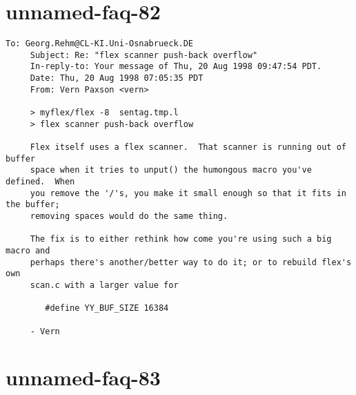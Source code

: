 \documentclass[openany,oneside]{book}
\begin{document}
\section{unnamed-faq-82}

\begin{verbatim}
To: Georg.Rehm@CL-KI.Uni-Osnabrueck.DE
     Subject: Re: "flex scanner push-back overflow"
     In-reply-to: Your message of Thu, 20 Aug 1998 09:47:54 PDT.
     Date: Thu, 20 Aug 1998 07:05:35 PDT
     From: Vern Paxson <vern>
     
     > myflex/flex -8  sentag.tmp.l
     > flex scanner push-back overflow
     
     Flex itself uses a flex scanner.  That scanner is running out of buffer
     space when it tries to unput() the humongous macro you've defined.  When
     you remove the '/'s, you make it small enough so that it fits in the buffer;
     removing spaces would do the same thing.
     
     The fix is to either rethink how come you're using such a big macro and
     perhaps there's another/better way to do it; or to rebuild flex's own
     scan.c with a larger value for
     
     	#define YY_BUF_SIZE 16384
     
     - Vern
\end{verbatim}

\section{unnamed-faq-83}
\end{document}
